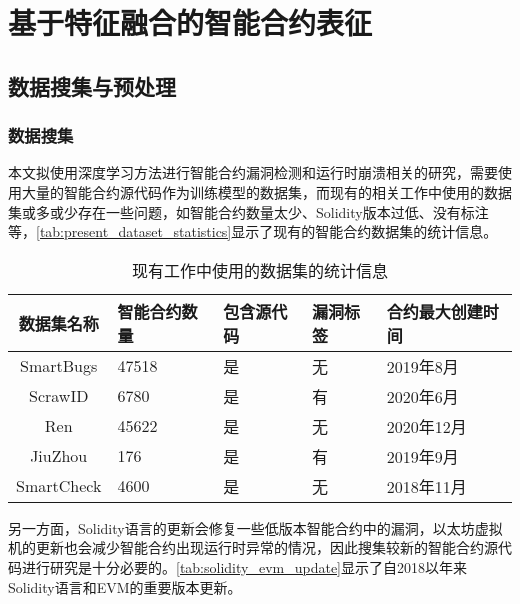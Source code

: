 \chapter{基于特征融合的智能合约表征}

\section{数据搜集与预处理}
\label{sec:数据搜集与预处理}
\subsection{数据搜集}
\label{sec:数据搜集}
本文拟使用深度学习方法进行智能合约漏洞检测和运行时崩溃相关的研究，需要使用大量的智能合约源代码作为训练模型的数据集，而现有的相关工作中使用的数据集或多或少存在一些问题，如智能合约数量太少、Solidity版本过低、没有标注等，\autoref{tab:present_dataset_statistics}显示了现有的智能合约数据集的统计信息。
\begin{table}[htbp]
    \caption{\label{tab:present_dataset_statistics}现有工作中使用的数据集的统计信息}
    \small
    \renewcommand{\arraystretch}{1.5}
    \begin{tabularx}{\linewidth}{cX<{\centering}X<{\centering}X<{\centering}p{3cm}}
        \hline
    数据集名称     & 智能合约数量 & 包含源代码 & 漏洞标签 & 合约最大创建时间            \\ \hline
    SmartBugs\cite{smartbugs} & 47518  & 是 & 无 & 2019年8月 \\
    ScrawID\cite{yashavant2022scrawld}    & 6780 & 是   & 有  & 2020年6月 \\
    Ren\cite{ren2021} &  45622 & 是 & 无 & 2020年12月 \\
    JiuZhou\cite{jiuzhou}   & 176  & 是  & 有   & 2019年9月 \\
    SmartCheck\cite{smartcheck}       & 4600   & 是 & 无 & 2018年11月  \\  \hline
    \end{tabularx}
\end{table}
另一方面，Solidity语言的更新会修复一些低版本智能合约中的漏洞，以太坊虚拟机的更新也会减少智能合约出现运行时异常的情况，因此搜集较新的智能合约源代码进行研究是十分必要的。\autoref{tab:solidity_evm_update}显示了自2018以年来Solidity语言和EVM的重要版本更新。

